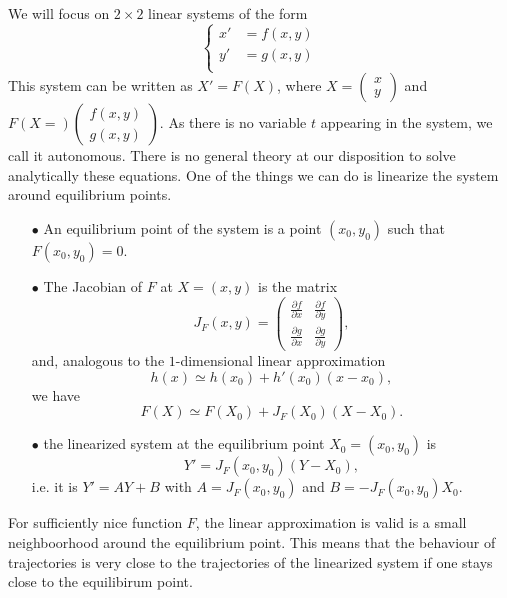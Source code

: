We will focus on $2\times 2$ linear systems of the form
\[\left\{\begin{array}{rcl}
x' & = f(x,y) \\
y' & = g(x,y) \\
\end{array}\right.\]
This system can be written as $X' = F(X)$, where $X= \begin{pmatrix} x \\ y \end{pmatrix}$ and $F(X=)\begin{pmatrix} f(x,y) \\ g(x,y) \end{pmatrix}$. As there is no variable $t$ appearing in the system, we call it autonomous. There is no general theory at our disposition to solve analytically these equations. One of the things we can do is linearize the system around equilibrium points.

\begin{itemize}
\item[$\bullet$] An equilibrium point of the system is a point $(x_0,y_0)$ such that $F(x_0,y_0)= 0$.
\item[$\bullet$] The Jacobian of $F$ at $X= (x,y)$ is the matrix 
\[J_F(x,y)=\begin{pmatrix} 
\frac{\partial f}{\partial x} & \frac{\partial f}{\partial y } \\ 
\frac{\partial g}{\partial x } & \frac{\partial g}{\partial y} 
\end{pmatrix},\]
and, analogous to the $1$-dimensional linear approximation \[h(x) \simeq h(x_0) + h'(x_0)(x-x_0),\] we have
\[F(X) \simeq F(X_0) + J_F(X_0)(X-X_0).\]
\item[$\bullet$] the linearized system at the equilibrium point $X_0=(x_0, y_0)$ is 
\[Y' = J_F(x_0,y_0) (Y - X_0),\]
i.e. it is $Y' = AY+B$ with $A =  J_F(x_0,y_0)$ and $B =  -J_F(x_0,y_0)X_0$.
\end{itemize}

For sufficiently nice function $F$, the linear approximation is valid is a small neighboorhood around the equilibrium point. This means that the behaviour of trajectories is very close to the trajectories of the linearized system if one stays close to the equilibirum point.\\

\\
\\

